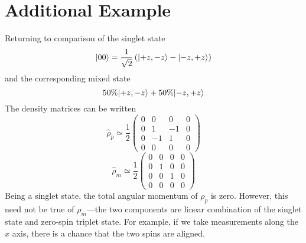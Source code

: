 \section{Additional Example}
Returning to comparison of the singlet state
\[\lvert00\rangle = \frac{1}{\sqrt{2}}\left(\lvert+z,-z\rangle-\lvert-z,+z\rangle\right)\]
and the corresponding mixed state
\[50\%\lvert+z,-z\rangle+50\%\lvert-z,+z\rangle\]
The density matrices can be written
\[\hat \rho_p \simeq \frac{1}{2} \begin{pmatrix}
	0 & 0 & 0 & 0 \\ 0 & 1 & -1 & 0 \\ 0 & -1 & 1 & 0 \\ 0 & 0 & 0 & 0 
\end{pmatrix}\]
\[\hat \rho_m \simeq \frac{1}{2} \begin{pmatrix}
	0 & 0 & 0 & 0 \\ 0 & 1 & 0 & 0 \\ 0 & 0 & 1 & 0 \\ 0 & 0 & 0 & 0 
\end{pmatrix}\]
Being a singlet state, the total angular momentum of \(\rho_p\) is zero. However, this need not be true of \(\rho_m\)---the two components are linear combination of the singlet state and zero-spin triplet state. For example, if we take measurements along the \(x\) axis, there is a chance that the two spins are aligned.

